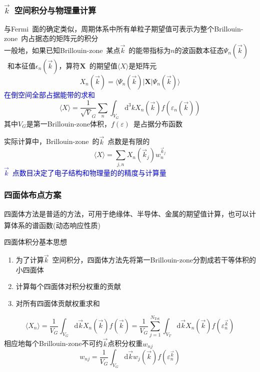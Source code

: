 \documentclass[cjk,slidestop,compress,mathserif,blue]{beamer}
\newcommand{\upcite}[1]{\hspace{0ex}\textsuperscript{\cite{#1}}} %
\begin{document}
\frame
{
\frametitle{$\vec k$~空间积分与物理量计算}
与\textrm{Fermi~}面的确定类似，周期体系中所有单粒子期望值可表示为整个\textrm{Brillouin-zone~}内占据态的矩阵元的积分\\

一般地，如果已知\textrm{Brillouin-zone~}某点$\vec k$~的能带指标为$n$的波函数本征态$\Psi_n(\vec k)$~和本征值$\epsilon_n(\vec k)$，算符$\mathbf{X}$~的期望值$\langle X \rangle$是矩阵元
\begin{displaymath}
	X_n(\vec k)=\langle\Psi_n(\vec k)|\mathbf{X}|\Psi_n(\vec k)\rangle 
\end{displaymath}
\textcolor{blue}{在倒空间全部占据能带的求和}
\begin{displaymath}
	\langle X\rangle=\dfrac1{\sqrt V_G}\sum_n\int_{V_G}\mathrm{d}^3kX_n(\vec k)f(\varepsilon_n(\vec k))
\end{displaymath}
其中$V_G$是第一\textrm{Brillouin-zone}体积，$f(\varepsilon)$~是占据分布函数

实际计算中，\textrm{Brillouin-zone~}的$\vec k$~点数是有限的
\begin{displaymath}
	\langle X\rangle=\sum_{j,n}X_n(\vec k_j)w_n^{\vec k_j}
\end{displaymath} 
\textcolor{blue}{$\vec k$~点数目决定了电子结构和物理量的的精度与计算量}
}

\frame
{
	\frametitle{四面体布点方案}
	四面体方法是普适的方法，可用于绝缘体、半导体、金属的期望值计算，也可以计算体系的谱函数(动态响应性质)\upcite{PRB49-16223_1994}

	四面体积分基本思想
	\begin{enumerate}
		\item 为了计算$\vec k$~空间积分，四面体方法先将第一\textrm{Brillouin-zone}分割成若干等体积的小四面体
		\item 计算每个四面体对积分权重的贡献
		\item 对所有四面体贡献权重求和
	\end{enumerate}
	\begin{displaymath}
		\langle X_n\rangle=\dfrac1{V_G}\int_{V_G}\mathrm{d}\vec kX_n(\vec k)f(\vec k)=\dfrac1{V_G}\sum_{j=1}^{N_{\mathrm{Tet}}}\int_{V_T}\mathrm{d}\vec kX_n(\vec k)f(\varepsilon_n^{\vec k})
	\end{displaymath}
	相应地每个\textrm{Brillouin-zone}不可约$\vec k$点积分权重$w_{nj}$
	\begin{displaymath}
		w_{nj}=\dfrac1{V_G}\int_{V_G}\mathrm{d}\vec kw_j(\vec k)f(\varepsilon_n^{\vec k})
	\end{displaymath}
}
\end{document}

